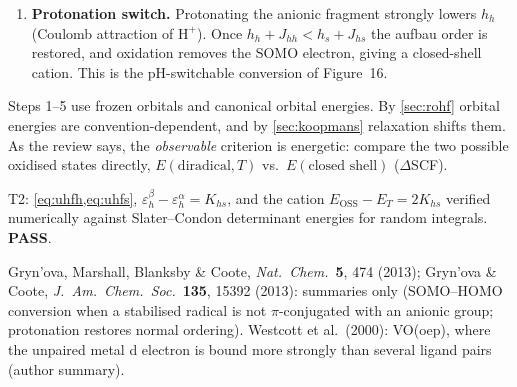 \begin{enumerate}
        a closed-shell anion; or the LUMO, at $\varepsilon_l$, giving the diradical $s^1h^2l^1$. Koopmans picks the
        lower: the diradical forms iff $\varepsilon_l<\varepsilon_s^\beta=h_s+J_{ss}+2J_{hs}-K_{hs}$. The large on-site
        repulsion $J_{ss}$ makes this possible. Note that this is a \emph{separate} condition, not implied by
        step 3; the review's Figure~10 depicts the case where it holds, and Figure~17 gives examples.
  \item \textbf{Protonation switch.} Protonating the anionic fragment strongly lowers $h_h$ (Coulomb attraction of
        $\mathrm H^+$). Once $h_h+J_{hh}<h_s+J_{hs}$ the aufbau order is restored, and oxidation removes the SOMO
        electron, giving a closed-shell cation. This is the pH-switchable conversion of Figure~16.
\end{enumerate}

\begin{caveatbox}
Steps 1--5 use frozen orbitals and canonical orbital energies. By \cref{sec:rohf} orbital energies are
convention-dependent, and by \cref{sec:koopmans} relaxation shifts them. As the review says, the
\emph{observable} criterion is energetic: compare the two possible oxidised states directly,
$E(\text{diradical},T)$ vs.\ $E(\text{closed shell})$ ($\Delta$SCF).
\end{caveatbox}



\begin{verifybox}
T2: \cref{eq:uhfh,eq:uhfs}, $\varepsilon_h^\beta-\varepsilon_h^\alpha=K_{hs}$, and the cation $E_{\text{OSS}}-E_T=2K_{hs}$ verified
numerically against Slater--Condon determinant energies for random integrals. \textbf{PASS}.
\end{verifybox}
\begin{sourcebox}
Gryn'ova, Marshall, Blanksby \& Coote, \emph{Nat.\ Chem.}\ \textbf{5}, 474 (2013); Gryn'ova \& Coote,
\emph{J.\ Am.\ Chem.\ Soc.}\ \textbf{135}, 15392 (2013): summaries only (SOMO--HOMO conversion when a stabilised
radical is not $\pi$-conjugated with an anionic group; protonation restores normal ordering). Westcott et al.\
(2000): VO(oep), where the unpaired metal d electron is bound more strongly than several ligand pairs
(author summary).
\end{sourcebox}
